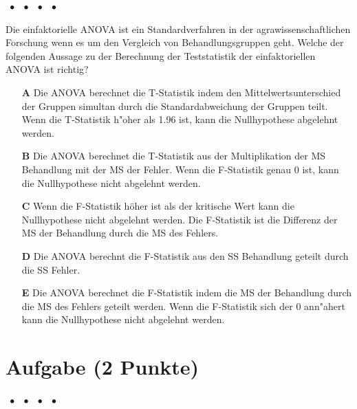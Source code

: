 \documentclass[a4paper, 9pt]{scrartcl}\usepackage[]{graphicx}\usepackage[]{xcolor}
\begin{document}
\ifcollection
\begin{flushright}
\tiny\vspace{-2Ex}
\textbf{\examinhaltstart}
\exammodulemathstat $\;\bullet$
\exammodulestat $\;\bullet$
\exammodulestatbbv $\;\bullet$
\exammodulestatversuch $\;\bullet$
\exammodulebiostat
\vspace{-1Ex}
\end{flushright}
\fi




Die einfaktorielle ANOVA ist ein Standardverfahren in der agrawissenschaftlichen Forschung wenn es um den Vergleich von Behandlungsgruppen geht. Welche der folgenden Aussage zu der Berechnung der Teststatistik der einfaktoriellen ANOVA ist richtig?



\begin{enumerate}
\item [\textbf{A} \msquare] Die ANOVA berechnet die T-Statistik indem den Mittelwertsunterschied der Gruppen simultan durch die Standardabweichung der Gruppen teilt. Wenn die T-Statistik h{"o}her als 1.96 ist, kann die Nullhypothese abgelehnt werden.
\item [\textbf{B} \msquare] Die ANOVA berechnet die T-Statistik aus der Multiplikation der MS Behandlung mit der MS der Fehler. Wenn die F-Statistik genau 0 ist, kann die Nullhypothese nicht abgelehnt werden.
\item [\textbf{C} \msquare] Wenn die F-Statistik höher ist als der kritische Wert kann die Nullhypothese nicht abgelehnt werden. Die F-Statistik ist die Differenz der MS der Behandlung durch die MS des Fehlers.
\item [\textbf{D} \msquare] Die ANOVA berechnt die F-Statistik aus den SS Behandlung geteilt durch die SS Fehler.
\item [\textbf{E} \msquare] Die ANOVA berechnet die F-Statistik indem die MS der Behandlung durch die MS des Fehlers geteilt werden. Wenn die F-Statistik sich der 0 ann{"a}hert kann die Nullhypothese nicht abgelehnt werden.
\end{enumerate}

\section{Aufgabe \hfill (2 Punkte)}

\ifcollection
\begin{flushright}
\tiny\vspace{-2Ex}
\textbf{\examinhaltstart}
\exammodulemathstat $\;\bullet$
\exammodulestat $\;\bullet$
\exammodulestatbbv $\;\bullet$
\exammodulestatversuch $\;\bullet$
\exammodulebiostat
\vspace{-1Ex}
\end{flushright}
\fi
\end{document}
